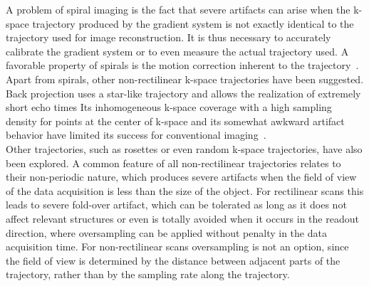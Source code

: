 A problem of spiral imaging is the fact that severe artifacts can arise when the k-space trajectory produced by the gradient system is not exactly identical to the trajectory used for image reconstruction. It is thus necessary to accurately calibrate the gradient system or to even measure the actual trajectory used. 
A favorable property of spirals is the motion correction inherent to the trajectory~\cite{SpiralMRI3}. 
Apart from spirals, other non-rectilinear k-space trajectories have been suggested. 
Back projection uses a star-like trajectory and allows the realization of extremely short echo times 
Its inhomogeneous k-space coverage with a high sampling density for points at the center of k-space and its somewhat awkward artifact behavior have limited its success for conventional imaging~\cite{SamplingStrategies}. \\
Other trajectories, such as rosettes or even random k-space trajectories, have also been explored. A common feature of all non-rectilinear trajectories relates to their non-periodic nature, which produces severe artifacts when the field of view of the data acquisition is less than the size of the object. For rectilinear scans this leads to severe fold-over artifact, which can be tolerated as long as it does not affect relevant structures or even is totally avoided when it occurs in the readout direction, where oversampling can be applied without penalty in the data acquisition time. For non-rectilinear scans oversampling is not an option, since the field of view is determined by the distance between adjacent parts of the trajectory, rather than by the sampling rate along the trajectory. 

